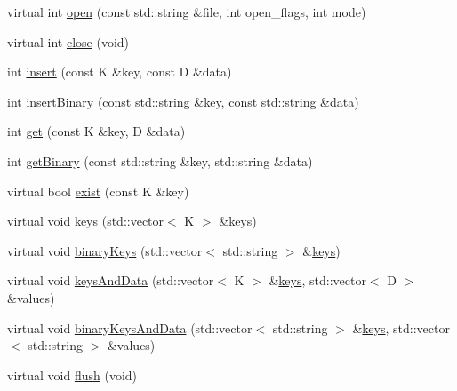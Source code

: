 \begin{DoxyCompactItemize}
\item 
virtual int \mbox{\hyperlink{classFILEDB_1_1ConfDataStoreDB_ab87e2fb12067bfb19c1f381a433fd442}{open}} (const std\+::string \&file, int open\+\_\+flags, int mode)
\item 
virtual int \mbox{\hyperlink{classFILEDB_1_1ConfDataStoreDB_aa322ea0136b8eacc11df2b5b52b3b6d5}{close}} (void)
\item 
int \mbox{\hyperlink{classFILEDB_1_1ConfDataStoreDB_a9917cff27ec340f88e59ddb9be630ecf}{insert}} (const K \&key, const D \&data)
\item 
int \mbox{\hyperlink{classFILEDB_1_1ConfDataStoreDB_a82fea8d8ac1a2c096614b213087a73d2}{insert\+Binary}} (const std\+::string \&key, const std\+::string \&data)
\item 
int \mbox{\hyperlink{classFILEDB_1_1ConfDataStoreDB_ad89d0c1aef7c82fb0273d50bfea7cf0a}{get}} (const K \&key, D \&data)
\item 
int \mbox{\hyperlink{classFILEDB_1_1ConfDataStoreDB_a971e372585c497dad3b1bc589bc4dd15}{get\+Binary}} (const std\+::string \&key, std\+::string \&data)
\item 
virtual bool \mbox{\hyperlink{classFILEDB_1_1ConfDataStoreDB_afedf2b2ec0b10469cebb72397b02459d}{exist}} (const K \&key)
\item 
virtual void \mbox{\hyperlink{classFILEDB_1_1ConfDataStoreDB_a794e05e3888ab95e0396a196b5a18e65}{keys}} (std\+::vector$<$ K $>$ \&keys)
\item 
virtual void \mbox{\hyperlink{classFILEDB_1_1ConfDataStoreDB_a1d0e8e27cd8fc6b24ece52259d1ab2b0}{binary\+Keys}} (std\+::vector$<$ std\+::string $>$ \&\mbox{\hyperlink{classFILEDB_1_1ConfDataStoreDB_a794e05e3888ab95e0396a196b5a18e65}{keys}})
\item 
virtual void \mbox{\hyperlink{classFILEDB_1_1ConfDataStoreDB_a94333e6aab463fd336bffb28d81dd39d}{keys\+And\+Data}} (std\+::vector$<$ K $>$ \&\mbox{\hyperlink{classFILEDB_1_1ConfDataStoreDB_a794e05e3888ab95e0396a196b5a18e65}{keys}}, std\+::vector$<$ D $>$ \&values)
\item 
virtual void \mbox{\hyperlink{classFILEDB_1_1ConfDataStoreDB_ae38beaf9ba3f8629f2c322a3c5a23357}{binary\+Keys\+And\+Data}} (std\+::vector$<$ std\+::string $>$ \&\mbox{\hyperlink{classFILEDB_1_1ConfDataStoreDB_a794e05e3888ab95e0396a196b5a18e65}{keys}}, std\+::vector$<$ std\+::string $>$ \&values)
\item 
virtual void \mbox{\hyperlink{classFILEDB_1_1ConfDataStoreDB_a982ae3b2108acbf75ab15a939fc7871b}{flush}} (void)
\item 

\end{DoxyCompactItemize}
